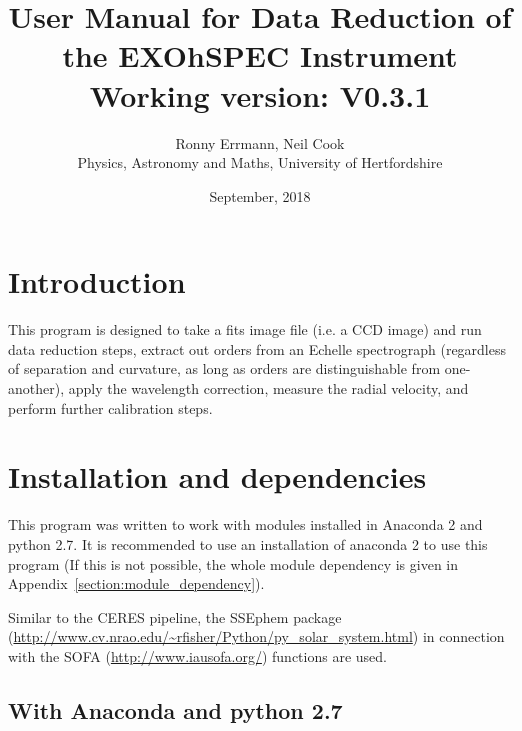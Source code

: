 \documentclass[10pt,a4paper]{article}
\title{User Manual for Data Reduction of the EXOhSPEC Instrument \\ Working version: V0.3.1}
\date{September, 2018}
\author{Ronny Errmann, Neil Cook\\ Physics, Astronomy and Maths, University of Hertfordshire}
\begin{document}
\maketitle

\tableofcontents
{}




\section{Introduction}
\label{intro}




This program is designed to take a fits image file (i.e. a CCD image) and run data reduction steps, extract out orders from an Echelle spectrograph (regardless of separation and curvature, as long as orders are distinguishable from one-another), apply the wavelength correction, measure the radial velocity, and perform further calibration steps. 



\newpage
\section{Installation and dependencies}
\label{installation}

\noindent This program was written to work with modules installed in Anaconda 2 and python 2.7. It is recommended to use an installation of anaconda 2 to use this program (If this is not possible, the whole module dependency is given in Appendix~\ref{section:module_dependency}).

Similar to the CERES pipeline, the SSEphem package (\url{http://www.cv.nrao.edu/~rfisher/Python/py_solar_system.html}) in connection with the SOFA (\url{http://www.iausofa.org/}) functions are used. 


\subsection{With Anaconda and python 2.7}
\end{document}
